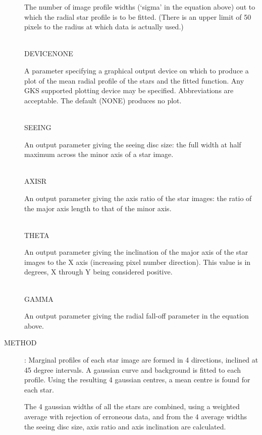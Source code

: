 \begin{description}
\begin{tabbing}
\begin{minipage}[t]{100mm}
The number of image profile widths (`sigma' in the equation above) out to which
the radial star profile is to be fitted.
(There is an upper limit of 50 pixels to the radius at which data is actually
used.)
\end{minipage}\\
DEVICE\>NONE\>\begin{minipage}[t]{100mm}
A parameter specifying a graphical output device on which to produce a plot of
the mean radial profile of the stars and the fitted function.
Any GKS supported plotting device may be specified.
Abbreviations are acceptable.
The default (NONE) produces no plot.
\end{minipage}\\
SEEING\>\>\begin{minipage}[t]{100mm}
An output parameter giving the seeing disc size: the full width at half
maximum across the minor axis of a star image.
\end{minipage}\\
AXISR\>\>\begin{minipage}[t]{100mm}
An output parameter giving the axis ratio of the star images: the ratio of the
major axis length to that of the minor axis.
\end{minipage}\\
THETA\>\>\begin{minipage}[t]{100mm}
An output parameter giving the inclination of the major axis of the star images
to the X axis (increasing pixel number direction).
This value is in degrees, X through Y being considered positive.
\end{minipage}\\
GAMMA\>\>\begin{minipage}[t]{100mm}
An output parameter giving the radial fall-off parameter in the equation above.
\end{minipage}
\end{tabbing}
\item [METHOD]:
Marginal profiles of each star image are formed in 4 directions, inclined at
45 degree intervals.
A gaussian curve and background is fitted to each profile.
Using the resulting 4 gaussian centres, a mean centre is found for each star.

The 4 gaussian widths of all the stars are combined, using a weighted average
with rejection of erroneous data, and from the 4 average widths the seeing disc
size, axis ratio and axis inclination are calculated.


\end{description}
